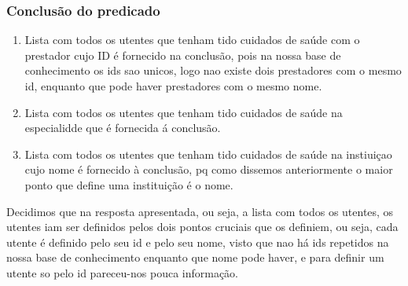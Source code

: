 \documentclass[a4paper]{report} %
\begin{document}
\subsubsection{Conclusão do predicado} 
\begin{enumerate}
\item Lista com todos os utentes que tenham tido cuidados de saúde com o prestador cujo ID é fornecido na conclusão, pois na nossa base de conhecimento os ids sao unicos, logo nao existe dois prestadores com o mesmo id, enquanto que pode haver prestadores com o mesmo nome.
\item Lista com todos os utentes que tenham tido cuidados de saúde na especialidde que é fornecida á conclusão.
\item Lista com todos os utentes que tenham tido cuidados de saúde na instiuiçao cujo nome é fornecido à conclusão, pq como dissemos anteriormente o maior ponto que define uma instituição é o nome.
\end{enumerate}

Decidimos que na resposta apresentada, ou seja, a lista com todos os utentes, os utentes iam ser definidos pelos dois pontos cruciais que os definiem, ou seja, cada utente é definido pelo seu id e pelo seu nome, visto que nao há ids repetidos na nossa base de conhecimento enquanto que nome pode haver, e para definir um utente so pelo id pareceu-nos pouca informação.
\end{document}
